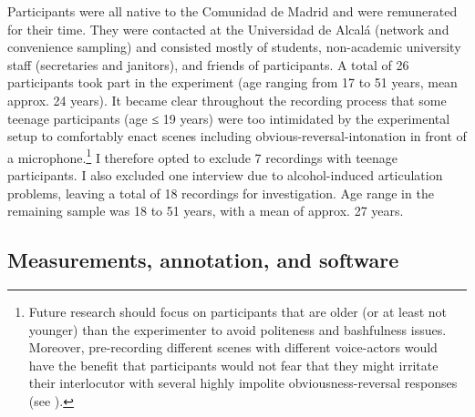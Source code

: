 Participants were all native to the Comunidad de Madrid and were remunerated for their time. They were contacted at the Universidad de Alcalá (network and convenience sampling) and consisted mostly of students, non-academic university staff (secretaries and janitors), and friends of participants. A total of 26 participants took part in the experiment (age ranging from 17 to 51 years, mean approx. 24 years). It became clear throughout the recording process that some teenage participants (age ≤ 19 years) were too intimidated by the experimental setup to comfortably enact scenes including ob\-vious-rever\-sal-into\-nation in front of a microphone.\footnote{Future research should focus on participants that are older (or at least not younger) than the experimenter to avoid politeness and bashfulness issues. Moreover, pre-recording different scenes with different voice-actors would have the benefit that participants would not fear that they might irritate their interlocutor with several highly impolite obviousness-reversal responses (see ).} I therefore opted to exclude 7 recordings with teenage participants. I also excluded one interview due to alcohol-induced articulation problems, leaving a total of 18 recordings for investigation. Age range in the remaining sample was 18 to 51 years, with a mean of approx. 27 years.

\subsection{Measurements, annotation, and software}\label{ch:6.1.3}\largerpage[2]

